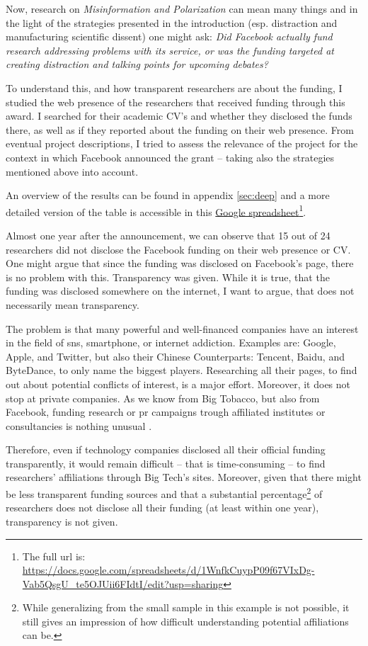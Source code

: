 Now, research on \textit{Misinformation and Polarization} can mean many things and in the light of the strategies presented in the introduction (esp. distraction and manufacturing scientific dissent) one might ask: \emph{Did Facebook actually fund research addressing problems with its service, or was the funding targeted at creating distraction and talking points for upcoming debates?}

To understand this, and how transparent researchers are about the funding, I studied the web presence of the researchers that received funding through this award. 
I searched for their academic CV's and whether they disclosed the funds there, as well as if they reported about the funding on their web presence.
From eventual project descriptions, I tried to assess the relevance of the project for the context in which Facebook announced the grant  -- taking also the strategies mentioned above into account.

An overview of the results can be found in appendix \ref{sec:deep} and a more detailed version of the table is accessible in this \href{https://docs.google.com/spreadsheets/d/1WnfkCuypP09f67VIxDg-Vab5QsgU_te5OJUii6FIdtI/edit?usp=sharing}{Google spreadsheet}\footnote{The full url is: \url{https://docs.google.com/spreadsheets/d/1WnfkCuypP09f67VIxDg-Vab5QsgU_te5OJUii6FIdtI/edit?usp=sharing}}.

Almost one year after the announcement, we can observe that 15 out of 24 researchers did not disclose the Facebook funding on their web presence or CV.
One might argue that since the funding was disclosed on Facebook's page, there is no problem with this. Transparency was given.
While it is true, that the funding was disclosed somewhere on the internet, I want to argue, that does not necessarily mean transparency.

The problem is that many powerful and well-financed companies have an interest in the field of \gls{sns}, smartphone, or internet addiction. 
Examples are: Google, Apple, and Twitter, but also their Chinese Counterparts: Tencent, Baidu, and ByteDance, to only name the biggest players.
Researching all their pages, to find out about potential conflicts of interest, is a major effort.
Moreover, it does not stop at private companies.
As we know from Big Tobacco, but also from Facebook, funding research or \gls{pr} campaigns trough affiliated institutes or consultancies is nothing unusual \citep{oreskes_merchants_2010, frenkel_delay_2018}.

Therefore, even if technology companies disclosed all their official funding transparently, it would remain difficult -- that is time-consuming -- to find researchers' affiliations through Big Tech's sites.
Moreover, given that there might be less transparent funding sources and that a substantial percentage\footnote{While generalizing from the small sample in this example is not possible, it still gives an impression of how difficult understanding potential affiliations can be.} of researchers does not disclose all their funding (at least within one year), transparency is not given.

